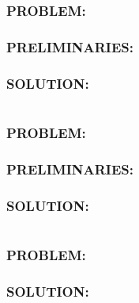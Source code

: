 \documentclass[]{article}
\newcommand{\Problem}{\subsubsection*{\textbf{PROBLEM:}}}
\newcommand{\Solution}{\subsubsection*{\textbf{SOLUTION:}}}
\newcommand{\Preliminaries}{\subsubsection*{\textbf{PRELIMINARIES:}}}
\begin{document}
\newpage
\section{}
\Problem



\Preliminaries


\Solution




\newpage
\section{}
\Problem



\Preliminaries


\Solution




\newpage
\section{}
\Problem



\Solution
\end{document}
